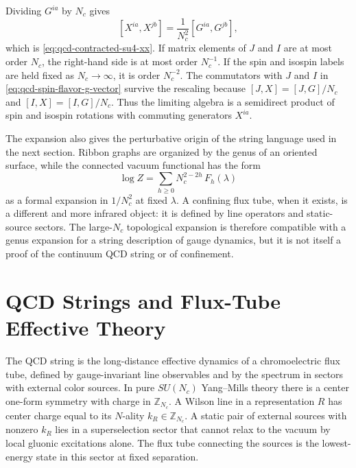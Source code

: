 Dividing \(G^{ia}\) by \(N_c\) gives
\[
  [X^{ia},X^{jb}]=\frac1{N_c^2}[G^{ia},G^{jb}],
\]
which is \eqref{eq:qcd-contracted-su4-xx}.  If matrix elements of \(J\) and
\(I\) are at most order \(N_c\), the right-hand side is at most order
\(N_c^{-1}\).  If the spin and isospin labels are held fixed as
\(N_c\to\infty\), it is order \(N_c^{-2}\).  The commutators with \(J\) and
\(I\) in \eqref{eq:qcd-spin-flavor-g-vector} survive the rescaling because
\([J,X]=[J,G]/N_c\) and \([I,X]=[I,G]/N_c\).  Thus the limiting algebra is a
semidirect product of spin and isospin rotations with commuting generators
\(X^{ia}\).

The expansion also gives the perturbative origin of the string language used
in the next section.  Ribbon graphs are organized by the genus of an oriented
surface, while the connected vacuum functional has the form
\[
  \log Z
  =
  \sum_{h\ge0} N_c^{2-2h}\,F_h(\lambda)
\]
as a formal expansion in \(1/N_c^2\) at fixed \(\lambda\).  A confining flux
tube, when it exists, is a different and more infrared object: it is defined
by line operators and static-source sectors.  The large-\(N_c\) topological
expansion is therefore compatible with a genus expansion for a string
description of gauge dynamics, but it is not itself a proof of the continuum
QCD string or of confinement.

\section{QCD Strings and Flux-Tube Effective Theory}

The QCD string is the long-distance effective dynamics of a chromoelectric
flux tube, defined by gauge-invariant line observables and by the spectrum in
sectors with external color sources.  In pure \(SU(N_c)\) Yang--Mills theory
there is a center one-form symmetry with charge in
\(\mathbb Z_{N_c}\).  A Wilson line in a representation \(R\) has center charge
equal to its \(N\)-ality \(k_R\in\mathbb Z_{N_c}\).  A static pair of external
sources with nonzero \(k_R\) lies in a superselection sector that cannot relax
to the vacuum by local gluonic excitations alone.  The flux tube connecting the
sources is the lowest-energy state in this sector at fixed separation.

